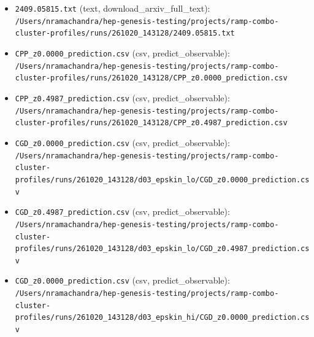 \documentclass[11pt,a4paper]{article}
\begin{document}
\begin{itemize}
  \item \texttt{2409.05815.txt} (text, download\_arxiv\_full\_text): \texttt{/\allowbreak{}Users/\allowbreak{}nramachandra/\allowbreak{}hep-genesis-testing/\allowbreak{}projects/\allowbreak{}ramp-combo-cluster-profiles/\allowbreak{}runs/\allowbreak{}261020\_\allowbreak{}143128/\allowbreak{}2409.05815.txt}
  \item \texttt{CPP\_\allowbreak{}z0.0000\_\allowbreak{}prediction.csv} (csv, predict\_observable): \texttt{/\allowbreak{}Users/\allowbreak{}nramachandra/\allowbreak{}hep-genesis-testing/\allowbreak{}projects/\allowbreak{}ramp-combo-cluster-profiles/\allowbreak{}runs/\allowbreak{}261020\_\allowbreak{}143128/\allowbreak{}CPP\_\allowbreak{}z0.0000\_\allowbreak{}prediction.csv}
  \item \texttt{CPP\_\allowbreak{}z0.4987\_\allowbreak{}prediction.csv} (csv, predict\_observable): \texttt{/\allowbreak{}Users/\allowbreak{}nramachandra/\allowbreak{}hep-genesis-testing/\allowbreak{}projects/\allowbreak{}ramp-combo-cluster-profiles/\allowbreak{}runs/\allowbreak{}261020\_\allowbreak{}143128/\allowbreak{}CPP\_\allowbreak{}z0.4987\_\allowbreak{}prediction.csv}
  \item \texttt{CGD\_\allowbreak{}z0.0000\_\allowbreak{}prediction.csv} (csv, predict\_observable): \texttt{/\allowbreak{}Users/\allowbreak{}nramachandra/\allowbreak{}hep-genesis-testing/\allowbreak{}projects/\allowbreak{}ramp-combo-cluster-profiles/\allowbreak{}runs/\allowbreak{}261020\_\allowbreak{}143128/\allowbreak{}d03\_\allowbreak{}epskin\_\allowbreak{}lo/\allowbreak{}CGD\_\allowbreak{}z0.0000\_\allowbreak{}prediction.csv}
  \item \texttt{CGD\_\allowbreak{}z0.4987\_\allowbreak{}prediction.csv} (csv, predict\_observable): \texttt{/\allowbreak{}Users/\allowbreak{}nramachandra/\allowbreak{}hep-genesis-testing/\allowbreak{}projects/\allowbreak{}ramp-combo-cluster-profiles/\allowbreak{}runs/\allowbreak{}261020\_\allowbreak{}143128/\allowbreak{}d03\_\allowbreak{}epskin\_\allowbreak{}lo/\allowbreak{}CGD\_\allowbreak{}z0.4987\_\allowbreak{}prediction.csv}
  \item \texttt{CGD\_\allowbreak{}z0.0000\_\allowbreak{}prediction.csv} (csv, predict\_observable): \texttt{/\allowbreak{}Users/\allowbreak{}nramachandra/\allowbreak{}hep-genesis-testing/\allowbreak{}projects/\allowbreak{}ramp-combo-cluster-profiles/\allowbreak{}runs/\allowbreak{}261020\_\allowbreak{}143128/\allowbreak{}d03\_\allowbreak{}epskin\_\allowbreak{}hi/\allowbreak{}CGD\_\allowbreak{}z0.0000\_\allowbreak{}prediction.csv}

\end{itemize}
\end{document}
